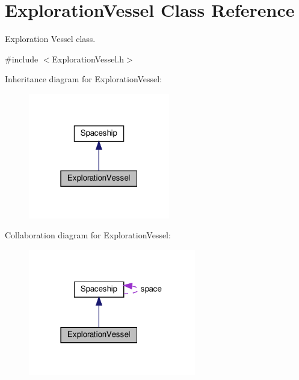 \hypertarget{classExplorationVessel}{}\section{Exploration\+Vessel Class Reference}
\label{classExplorationVessel}


Exploration Vessel class.  




{\ttfamily \#include $<$Exploration\+Vessel.\+h$>$}



Inheritance diagram for Exploration\+Vessel\+:\nopagebreak
\begin{figure}[H]
\begin{center}
\leavevmode
\includegraphics[width=175pt]{classExplorationVessel__inherit__graph}
\end{center}
\end{figure}


Collaboration diagram for Exploration\+Vessel\+:\nopagebreak
\begin{figure}[H]
\begin{center}
\leavevmode
\includegraphics[width=207pt]{classExplorationVessel__coll__graph}
\end{center}
\end{figure}
